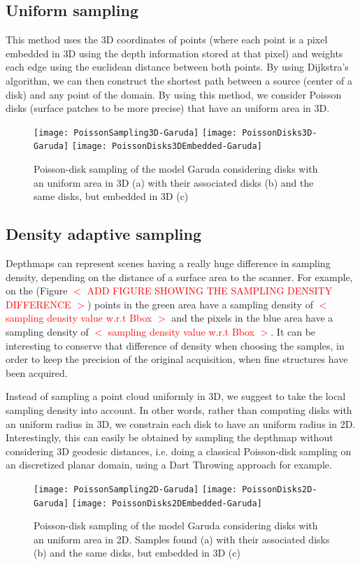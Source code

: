 \documentclass[11pt,fleqn]{book} %
\newcommand{\arnaud}[1]{\textcolor{red}{$<$ #1 $>$}}
\begin{document}
\subsection{Uniform sampling}
This method uses the 3D coordinates of points (where each point is a pixel embedded in 3D using the depth information stored at that pixel) and weights each edge using the euclidean distance between both points.
By using Dijkstra's algorithm, we can then construct the shortest path between a source (center of a disk) and any point of the domain. 
By using this method, we consider Poisson disks (surface patches to be more precise) that have an uniform area in 3D.

\begin{figure}[ht]
\centering
\texttt{[image: PoissonSampling3D-Garuda]}
\texttt{[image: PoissonDisks3D-Garuda]}
\texttt{[image: PoissonDisks3DEmbedded-Garuda]}
\caption{Poisson-disk sampling of the model Garuda considering disks with an uniform area in 3D (a) with their associated disks (b) and the same disks, but embedded in 3D (c)}
\label{fig:poisson_sampling_3d}
\end{figure}

\subsection{Density adaptive sampling}
Depthmaps can represent scenes having a really huge difference in sampling density, depending on the distance of a surface area to the scanner. 
For example, on the (Figure \arnaud{ADD FIGURE SHOWING THE SAMPLING DENSITY DIFFERENCE}) points in the green area have a sampling density of \arnaud{sampling density value w.r.t Bbox} and the pixels in the blue area have a sampling density of \arnaud{sampling density value w.r.t Bbox}. It can be interesting to conserve that difference of density when choosing the samples, in order to keep the precision of the original acquisition, when fine structures have been acquired.

Instead of sampling a point cloud uniformly in 3D, we suggest to take the local sampling density into account. In other words, rather than computing disks with an uniform radius in 3D, we constrain each disk to have an uniform radius in 2D.
Interestingly, this can easily be obtained by sampling the depthmap without considering 3D geodesic distances, i.e. doing a classical Poisson-disk sampling on an discretized planar domain, using a Dart Throwing approach for example.

\begin{figure}[ht]
\centering
\texttt{[image: PoissonSampling2D-Garuda]}
\texttt{[image: PoissonDisks2D-Garuda]}
\texttt{[image: PoissonDisks2DEmbedded-Garuda]}
\caption{Poisson-disk sampling of the model Garuda considering disks with an uniform area in 2D. Samples found (a) with their associated disks (b) and the same disks, but embedded in 3D (c)}
\label{fig:poisson_sampling_2d}
\end{figure}
\end{document}

